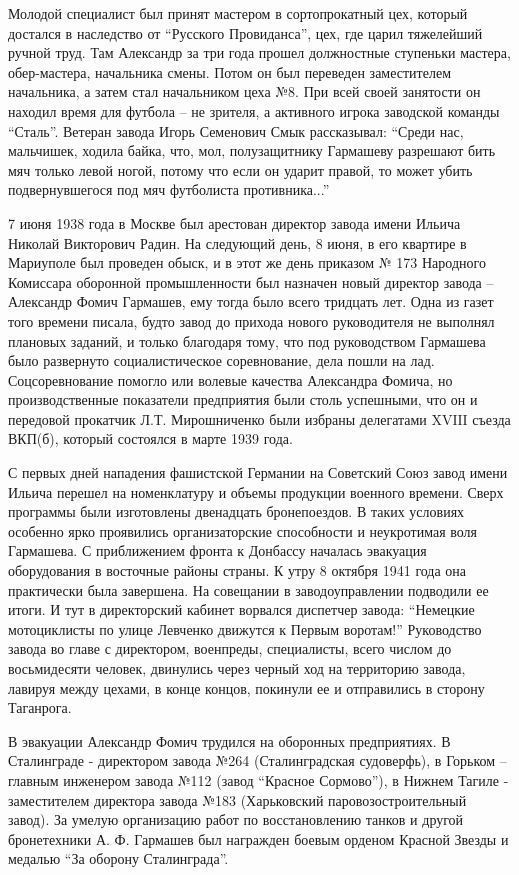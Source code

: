 Молодой специалист был принят мастером в сортопрокатный цех, который достался в
наследство от \enquote{Русского Провиданса}, цех, где царил тяжелейший ручной труд. Там
Александр за три года прошел должностные ступеньки мастера, обер-мастера,
начальника смены. Потом он был переведен заместителем начальника, а затем стал
начальником цеха №8. При всей своей занятости он находил время для футбола – не
зрителя, а активного игрока заводской команды \enquote{Сталь}. Ветеран завода Игорь
Семенович Смык рассказывал: \enquote{Среди нас, мальчишек, ходила байка, что, мол,
полузащитнику Гармашеву разрешают бить мяч только левой ногой, потому что если
он ударит правой, то может убить подвернувшегося под мяч футболиста противника...}

7 июня 1938 года в Москве был арестован директор завода имени Ильича Николай
Викторович Радин. На следующий день, 8 июня, в его квартире в Мариуполе был
проведен обыск, и в этот же день приказом № 173 Народного Комиссара оборонной
промышленности был назначен новый директор завода – Александр Фомич Гармашев,
ему тогда было всего тридцать лет. Одна из газет того времени писала, будто
завод до прихода нового руководителя не выполнял плановых заданий, и только
благодаря тому, что под руководством Гармашева было развернуто социалистическое
соревнование, дела пошли на лад. Соцсоревнование помогло или волевые качества
Александра Фомича, но производственные показатели предприятия были столь
успешными, что он и передовой прокатчик Л.Т. Мирошниченко были избраны
делегатами  XVΙΙΙ съезда ВКП(б), который состоялся в марте 1939 года.

С первых дней нападения фашистской Германии на Советский Союз завод имени
Ильича перешел на номенклатуру и объемы продукции военного времени. Сверх
программы были изготовлены двенадцать бронепоездов. В таких условиях особенно
ярко проявились организаторские способности и неукротимая воля Гармашева. С
приближением фронта к Донбассу началась эвакуация оборудования в восточные
районы  страны. К утру 8 октября 1941 года она практически была завершена. На
совещании в заводоуправлении подводили ее итоги. И тут в директорский кабинет
ворвался диспетчер завода: \enquote{Немецкие мотоциклисты по улице Левченко движутся к
Первым воротам!} Руководство завода во главе с директором, военпреды,
специалисты, всего числом до восьмидесяти человек, двинулись через черный ход
на территорию завода, лавируя между цехами, в конце концов, покинули ее и
отправились в сторону Таганрога.

В эвакуации Александр Фомич трудился на оборонных предприятиях. В Сталинграде -
директором завода №264 (Сталинградская судоверфь), в Горьком – главным
инженером завода №112 (завод \enquote{Красное Сормово}), в Нижнем Тагиле  -
заместителем директора завода №183 (Харьковский паровозостроительный завод). За
умелую организацию работ по восстановлению танков и другой бронетехники А. Ф.
Гармашев был награжден боевым орденом Красной Звезды и медалью \enquote{За оборону
Сталинграда}.  

